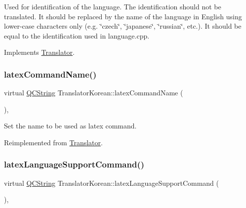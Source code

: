 Used for identification of the language. The identification should not be translated. It should be replaced by the name of the language in English using lower-\/case characters only (e.\+g. \char`\"{}czech\char`\"{}, \char`\"{}japanese\char`\"{}, \char`\"{}russian\char`\"{}, etc.). It should be equal to the identification used in language.\+cpp. 

Implements \mbox{\hyperlink{class_translator}{Translator}}.

\mbox{\label{class_translator_korean_af309b5d610ebe93451744e88db8a0f20}} 
\subsubsection{\texorpdfstring{latexCommandName()}{latexCommandName()}}
{\footnotesize\ttfamily virtual \mbox{\hyperlink{class_q_c_string}{Q\+C\+String}} Translator\+Korean\+::latex\+Command\+Name (\begin{DoxyParamCaption}{ }\end{DoxyParamCaption})\hspace{0.3cm}{\ttfamily [inline]}, {\ttfamily [virtual]}}

Set the name to be used as latex command. 

Reimplemented from \mbox{\hyperlink{class_translator_a9e87df46e59ca15713f43205aeb17ea0}{Translator}}.

\mbox{\label{class_translator_korean_aca14550a63c96a39db1c703bc834c766}} 
\subsubsection{\texorpdfstring{latexLanguageSupportCommand()}{latexLanguageSupportCommand()}}
{\footnotesize\ttfamily virtual \mbox{\hyperlink{class_q_c_string}{Q\+C\+String}} Translator\+Korean\+::latex\+Language\+Support\+Command (\begin{DoxyParamCaption}{ }\end{DoxyParamCaption})\hspace{0.3cm}{\ttfamily [inline]}, {\ttfamily [virtual]}}

